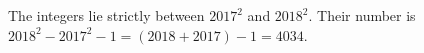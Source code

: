 The integers lie strictly between $2017^2$ and $2018^2$. Their number is $2018^2-2017^2-1=(2018+2017)-1=\boxed{4034}$.
